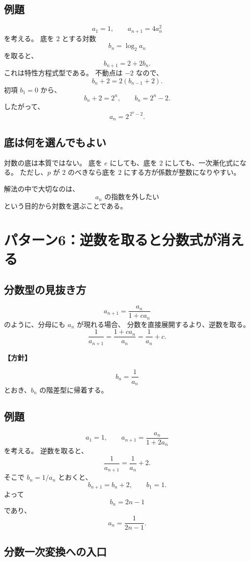 \subsection{例題}

\[
  a_1=1,\qquad a_{n+1}=4a_n^2
\]
を考える。
底を $2$ とする対数
\[
  b_n=\log_2a_n
\]
を取ると、
\[
  b_{n+1}=2+2b_n.
\]
これは特性方程式型である。
不動点は $-2$ なので、
\[
  b_n+2=2(b_{n-1}+2).
\]
初項 $b_1=0$ から、
\[
  b_n+2=2^n,
  \qquad
  b_n=2^n-2.
\]
したがって、
\[
  \boxed{a_n=2^{\,2^n-2}}.
\]

\subsection{底は何を選んでもよい}

対数の底は本質ではない。
底を $e$ にしても、底を $2$ にしても、一次漸化式になる。
ただし、$p$ が $2$ のべきなら底を $2$ にする方が係数が整数になりやすい。

解法の中で大切なのは、
\[
  a_n\text{ の指数を外したい}
\]
という目的から対数を選ぶことである。

\section{パターン6：逆数を取ると分数式が消える}

\subsection{分数型の見抜き方}

\[
  a_{n+1}=\frac{a_n}{1+ca_n}
\]
のように、分母にも $a_n$ が現れる場合、
分数を直接展開するより、逆数を取る。
\[
  \frac1{a_{n+1}}
  =\frac{1+ca_n}{a_n}
  =\frac1{a_n}+c.
\]

\noindent\textbf{【方針】}

\[
  b_n=\frac1{a_n}
\]
とおき、$b_n$ の階差型に帰着する。

\subsection{例題}

\[
  a_1=1,\qquad
  a_{n+1}=\frac{a_n}{1+2a_n}
\]
を考える。
逆数を取ると、
\[
  \frac1{a_{n+1}}
  =\frac1{a_n}+2.
\]
そこで $b_n=1/a_n$ とおくと、
\[
  b_{n+1}=b_n+2,\qquad b_1=1.
\]
よって
\[
  b_n=2n-1
\]
であり、
\[
  \boxed{a_n=\frac1{2n-1}}.
\]

\subsection{分数一次変換への入口}

